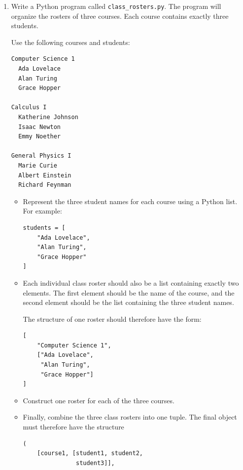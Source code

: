 \documentclass{article}
\begin{document}
\begin{enumerate}

\item Write a Python program called \texttt{class\_rosters.py}.  The program will organize the rosters of three courses.  Each course contains exactly three students.

Use the following courses and students:

\begin{verbatim}
Computer Science 1
  Ada Lovelace
  Alan Turing
  Grace Hopper

Calculus I
  Katherine Johnson
  Isaac Newton
  Emmy Noether

General Physics I
  Marie Curie
  Albert Einstein
  Richard Feynman
\end{verbatim}

\begin{itemize}

\item Represent the three student names for each course using a Python list.  For example:
\begin{verbatim}
students = [
    "Ada Lovelace",
    "Alan Turing",
    "Grace Hopper"
]
\end{verbatim}
\vspace{0.25cm}

\item Each individual class roster should also be a list containing exactly two elements.  The first element should be the name of the course, and the second element should be the list containing the three student names.

The structure of one roster should therefore have the form:
\begin{verbatim}
[
    "Computer Science 1",
    ["Ada Lovelace",
     "Alan Turing",
     "Grace Hopper"]
]
\end{verbatim}
\vspace{0.25cm}

\item Construct one roster for each of the three courses. \\ \vspace{0.25cm}

\item Finally, combine the three class rosters into one tuple.  The final object must therefore have the structure

\begin{verbatim}
(
    [course1, [student1, student2,
               student3]],


\end{verbatim}
\end{itemize}
\end{enumerate}
\end{document}
